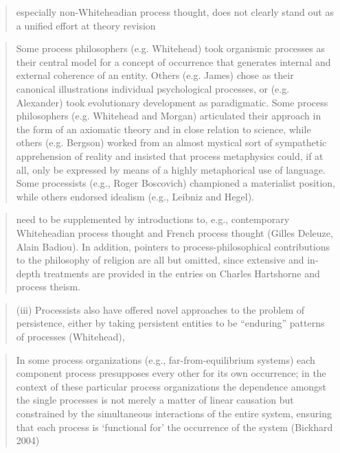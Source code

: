 \documentclass[a4paper]{Thesis}
\begin{document}
	\begin{quotation}
		especially non-Whiteheadian process thought, does not clearly stand out as a unified effort at theory revision
	\end{quotation}
	\begin{quotation}
		Some process philosophers (e.g. Whitehead) took organismic processes as their central model for a concept of occurrence that generates internal and external coherence of an entity. Others (e.g. James) chose as their canonical illustrations individual psychological processes, or (e.g. Alexander) took evolutionary development as paradigmatic. Some process philosophers (e.g. Whitehead and Morgan) articulated their approach in the form of an axiomatic theory and in close relation to science, while others (e.g. Bergson) worked from an almost mystical sort of sympathetic apprehension of reality and insisted that process metaphysics could, if at all, only be expressed by means of a highly metaphorical use of language. Some processists (e.g., Roger Boscovich) championed a materialist position, while others endorsed idealism (e.g., Leibniz and Hegel).
	\end{quotation}
	\begin{quotation}
		need to be supplemented by introductions to, e.g., contemporary Whiteheadian process thought and French process thought (Gilles Deleuze, Alain Badiou). In addition, pointers to process-philosophical contributions to the philosophy of religion are all but omitted, since extensive and in-depth treatments are provided in the entries on Charles Hartshorne and process theism.
	\end{quotation}
	\begin{quotation}
		(iii) Processists also have offered novel approaches to the problem of persistence, either by taking persistent entities to be “enduring” patterns of processes (Whitehead), 
	\end{quotation}
	\begin{quotation}
		In some process organizations (e.g., far-from-equilibrium systems) each component process presupposes every other for its own occurrence; in the context of these particular process organizations the dependence amongst the single processes is not merely a matter of linear causation but constrained by the simultaneous interactions of the entire system, ensuring that each process is ‘functional for’ the occurrence of the system (Bickhard 2004)
		
	\end{quotation}
	
\end{document}
